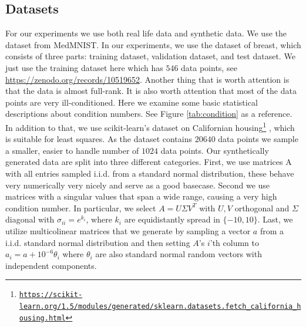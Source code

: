 \documentclass{article}
\begin{document}
\subsection{Datasets}
\label{sec:datasets}
For our experiments we use both real life data and synthetic data. 
We use the dataset from MedMNIST\cite{medmnistv1,medmnistv2}. In our experiments, we use the dataset of breast, which consists of three parts: training dataset, validation dataset, and test dataset. We just use the training dataset here which has $546$ data points, see \href{https://zenodo.org/records/10519652} {https://zenodo.org/records/10519652}. 
Another thing that is worth attention is that the data is almost full-rank. It is also worth attention that most of the data points are very ill-conditioned. 
Here we examine some basic statistical descriptions about condition numbers. See Figure \ref{tab:condition} as a reference. 
In addition to that, we use scikit-learn's dataset on Californian housing\footnote{\href{https://scikit-learn.org/1.5/modules/generated/sklearn.datasets.fetch_california_housing.html}{\texttt{https://scikit-learn.org/1.5/modules/generated/sklearn.datasets.fetch\_california\_housing.html}}}
, which is suitable for least squares.
As the dataset contains $20640$ data points we sample a smaller, easier to handle number of $1024$ data points.
Our synthetically generated data are split into three different categories. First, we use matrices A with all entries sampled i.i.d. from a standard normal distribution, these behave very numerically very nicely and serve as a good basecase. Second we use matrices with a singular values that span a wide range, causing a very high condition number. In particular, we select $A = U \Sigma V^T$ with $U, V$ orthogonal and $\Sigma$ diagonal with $\sigma_{ii} = e^{k_i}$, where $k_i$ are equidistantly spread in $\{-10, 10\}$. Last, we utilize multicolinear matrices that we generate by sampling a vector $a$ from a i.i.d. standard normal distribution and then setting $A$'s $i$'th column to $a_i = a + 10^{-6}\theta_i$ where $\theta_i$ are also standard normal random vectors with independent components. 
\end{document}
